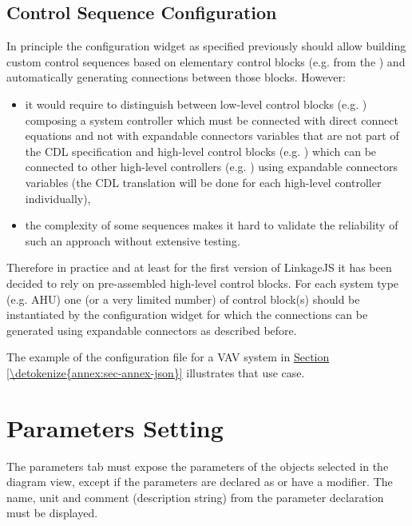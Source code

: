 \documentclass[letterpaper,10pt, openany,english]{sphinxmanual}
\begin{document}
\subsection{Control Sequence Configuration}
\label{\detokenize{requirements:control-sequence-configuration}}
In principle the configuration widget as specified previously should allow building custom control sequences based on elementary control blocks (e.g. from the ) and automatically generating connections between those blocks. However:
\begin{itemize}
\item {} 
it would require to distinguish between low-level control blocks (e.g. ) composing a system controller \textendash{} which must be connected with direct connect equations and not with expandable connectors variables that are not part of the CDL specification \textendash{} and high-level control blocks (e.g. ) \textendash{} which can be connected to other high-level controllers (e.g. ) using expandable connectors variables (the CDL translation will be done for each high-level controller individually),

\item {} 
the complexity of some sequences makes it hard to validate the reliability of such an approach without extensive testing.

\end{itemize}

Therefore in practice and at least for the first version of LinkageJS it has been decided to rely on pre-assembled high-level control blocks. For each system type (e.g. AHU) one (or a very limited number) of control block(s) should be instantiated by the configuration widget for which the connections can be generated using expandable connectors as described before.

The example of the configuration file for a VAV system in \hyperref[\detokenize{annex:sec-annex-json}]{Section \ref{\detokenize{annex:sec-annex-json}}} illustrates that use case.


\section{Parameters Setting}
\label{\detokenize{requirements:parameters-setting}}\label{\detokenize{requirements:sec-parameters}}
The parameters tab must expose the parameters of the objects selected in the diagram view, except if the parameters are declared as  or have a  modifier. The name, unit and comment (description string) from the parameter declaration must be displayed.
\end{document}
